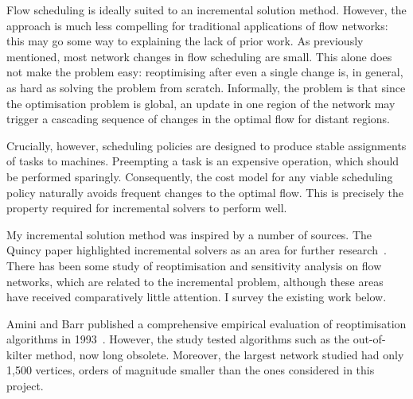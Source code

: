 Flow scheduling is ideally suited to an incremental solution method. However, the approach is much less compelling for traditional applications of flow networks: this may go some way to explaining the lack of prior work. As previously mentioned, most network changes in flow scheduling are small. This alone does not make the problem easy: reoptimising after even a single change is, in general, as hard as solving the problem from scratch\footnotemark. Informally, the problem is that since the optimisation problem is global, an update in one region of the network may trigger a cascading sequence of changes in the optimal flow for distant regions.

Crucially, however, scheduling policies are designed to produce stable assignments of tasks to machines. Preempting a task is an expensive operation, which should be performed sparingly. Consequently, the cost model for any viable scheduling policy naturally avoids frequent changes to the optimal flow. This is precisely the property required for incremental solvers to perform well.

My incremental solution method was inspired by a number of sources. The Quincy paper highlighted incremental solvers as an area for further research~\cite[\S6.5]{Isard:2007}. There has been some study of reoptimisation and sensitivity analysis on flow networks, which are related to the incremental problem, although these areas have received comparatively little attention. I survey the existing work below.

Amini and Barr published a comprehensive empirical evaluation of reoptimisation algorithms in 1993~\cite{Amini:1993}. However, the study tested algorithms such as the out-of-kilter method, now long obsolete. Moreover, the largest network studied had only 1,500 vertices, orders of magnitude smaller than the ones considered in this project. 

